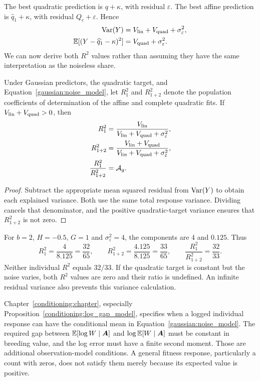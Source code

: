 The best quadratic prediction is $q+\kappa$, with residual $\varepsilon$.
The best affine prediction is $\widehat q_1+\kappa$, with residual
$Q_c+\varepsilon$. Hence
\begin{align}
\operatorname{Var}(Y)&=V_{\mathrm{lin}}+V_{\mathrm{quad}}+\sigma_\varepsilon^2,\nonumber\\
\mathbb E[(Y-\widehat q_1-\kappa)^2]
 &=V_{\mathrm{quad}}+\sigma_\varepsilon^2.
\end{align}
We can now derive both $R^2$ values rather than assuming they have the same
interpretation as the noiseless share.
\begin{proposition}
\label{gaussian:nested_r2}
Under Gaussian predictors, the quadratic target, and
Equation~\eqref{gaussian:noise_model}, let $R_1^2$ and $R_{1+2}^2$ denote
the population coefficients of determination of the affine and complete
quadratic fits. If $V_{\mathrm{lin}}+V_{\mathrm{quad}}>0$, then
\begin{align}
R_1^2&=\frac{V_{\mathrm{lin}}}
 {V_{\mathrm{lin}}+V_{\mathrm{quad}}+\sigma_\varepsilon^2},\nonumber\\
R_{1+2}^2&=\frac{V_{\mathrm{lin}}+V_{\mathrm{quad}}}
 {V_{\mathrm{lin}}+V_{\mathrm{quad}}+\sigma_\varepsilon^2},\nonumber\\
\frac{R_1^2}{R_{1+2}^2}&=\mathcal A_g.
\label{gaussian:nested_ratio}
\end{align}
\end{proposition}
\begin{proof}
Subtract the appropriate mean squared residual from $\operatorname{Var}(Y)$ to obtain
each explained variance. Both use the same total response variance.
Dividing cancels that denominator, and the positive quadratic-target
variance ensures that $R_{1+2}^2$ is not zero.
\end{proof}

For $b=2$, $H=-0.5$, $G=1$ and $\sigma_\varepsilon^2=4$, the components
are $4$ and $0.125$. Thus
\[
R_1^2=\frac{4}{8.125}=\frac{32}{65},\qquad
R_{1+2}^2=\frac{4.125}{8.125}=\frac{33}{65},\qquad
\frac{R_1^2}{R_{1+2}^2}=\frac{32}{33}.
\]
Neither individual $R^2$ equals $32/33$. If the quadratic target is
constant but the noise varies, both $R^2$ values are zero and their ratio
is undefined. An infinite residual variance also prevents this variance
calculation.

Chapter~\ref{conditioning:chapter}, especially
Proposition~\ref{conditioning:log_gap_model}, specifies when a logged
individual response can have the conditional mean in
Equation~\eqref{gaussian:noise_model}. The required gap between
$\mathbb E[\log W\mid\boldsymbol{A}]$ and $\log\mathbb E[W\mid\boldsymbol{A}]$ must be
constant in breeding value, and the log error must have a finite second
moment. Those are additional observation-model conditions. A general
fitness response, particularly a count with zeros, does not satisfy them
merely because its expected value is positive.


